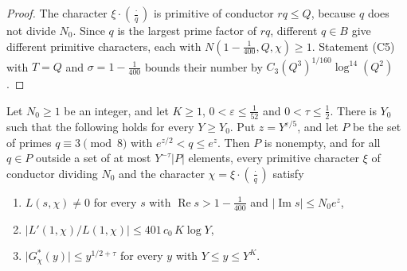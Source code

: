 \begin{proof}
The character $\xi\cdot(\frac{\cdot}{q})$ is primitive of conductor $rq\le Q$, because $q$ does not divide $N_0$. Since $q$ is the largest prime factor of $rq$, different $q\in B$ give different primitive characters, each with $N(1-\frac1{400},Q,\chi)\ge1$. Statement (C5) with $T=Q$ and $\sigma=1-\frac1{400}$ bounds their number by $C_3(Q^3)^{1/160}\log^{14}(Q^2)$.
\end{proof}

\begin{theorem}\label{stage1}
Let $N_0\ge1$ be an integer, and let $K\ge1$, $0<\varepsilon\le\frac1{52}$ and $0<\tau\le\frac12$. There is $Y_0$ such that the following holds for every $Y\ge Y_0$. Put $z=Y^{\varepsilon/5}$, and let $P$ be the set of primes $q\equiv3\pmod8$ with $e^{z/2}<q\le e^z$. Then $P$ is nonempty, and for all $q\in P$ outside a set of at most $Y^{-\tau}\lvert P\rvert$ elements, every primitive character $\xi$ of conductor dividing $N_0$ and the character $\chi=\xi\cdot(\frac{\cdot}{q})$ satisfy
\begin{enumerate}
\item[(i)] $L(s,\chi)\ne0$ for every $s$ with $\operatorname{Re}s>1-\frac1{400}$ and $\lvert\operatorname{Im}s\rvert\le N_0e^z$,
\item[(ii)] $\lvert L'(1,\chi)/L(1,\chi)\rvert\le401\,c_0\,K\log Y$,
\item[(iii)] $\lvert G^\ast_\chi(y)\rvert\le y^{1/2+\tau}$ for every $y$ with $Y\le y\le Y^K$.
\end{enumerate}
\end{theorem}

